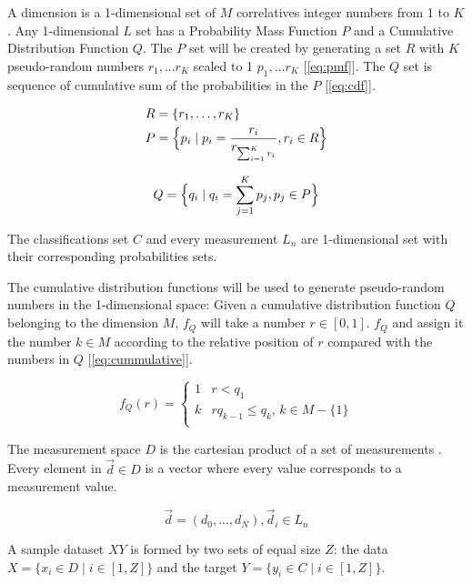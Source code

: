 \documentclass[letterpaper, conference]{IEEEtran}
\begin{document}
A dimension is a 1-dimensional set of $M$ correlatives integer numbers from 1 to $K$. Any 1-dimensional $L$ set has a Probability Mass Function $P$ and a Cumulative Distribution Function $Q$. The $P$ set will be created by generating a set $R$ with $K$ pseudo-random numbers $r_1, ...r_K$ scaled to 1 $p_1, ...r_K$ [\ref{eq:pmf}]. The $Q$ set is sequence of cumulative sum of the probabilities in the $P$ [\ref{eq:cdf}].

\begin{equation}\label{eq:pmf}
  \begin{aligned}
  R &= \{r_1, \dots, r_K\} \\
  P &= \Bigl\{p_i \mid p_i = \frac{r_i}{r_{\sum_{i = 1}^{K} r_i}}, r_i \in R \Bigr\}
  \end{aligned}
\end{equation}

\begin{equation}\label{eq:cdf}
Q = \Bigl\{q_i \mid q_i = \sum_{j = 1}^{K} p_j, p_j \in P \Bigr\}
\end{equation}

The classifications set $C$ and every measurement $L_n$ are 1-dimensional set with their corresponding probabilities sets.

The cumulative distribution functions will be used to generate pseudo-random numbers in the 1-dimensional space: Given a cumulative distribution function $Q$ belonging to the dimension $M$, $f_Q$ will take a number $r \in [0, 1]$. $f_Q$ and assign it the number $k \in M$ according to the relative position of $r$ compared with the numbers in $Q$ [\ref{eq:cummulative}].

\begin{equation}\label{eq:cummulative}
  f_Q(r) =
  \begin{cases}
  1 & r < q_1 \\
  k & r q_{k - 1} \leq q_k,\, k \in M - \{1\} \\
  \end{cases}
\end{equation}

The measurement space $D$ is the cartesian product of a set of measurements \label{eq:measurement-space}. Every element in $\vec{d} \in D$ is a vector where every value corresponds to a measurement value.

\begin{equation}
  \vec{d} = (d_0, ..., d_N), \vec{d}_i \in L_n
\end{equation}

A sample dataset $XY$ is formed by two sets of equal size $Z$: the data $ X = \{x_i \in D \mid i \in [1, Z]\}$ and the target $Y = \{ y_i \in C \mid i \in [1, Z]\}$.
\end{document}
